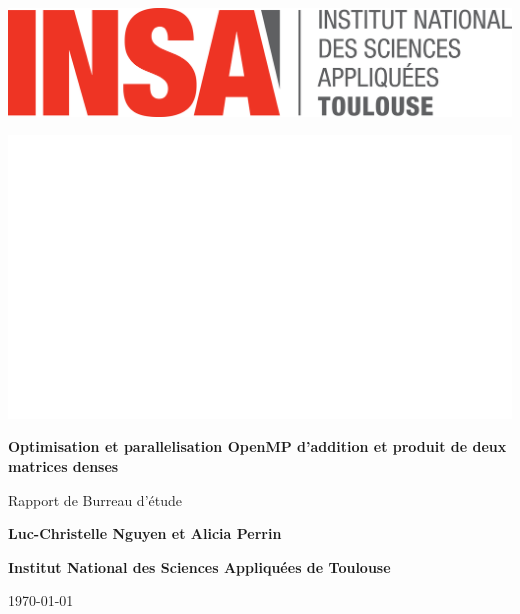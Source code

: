 \documentclass{report}
\begin{document}
\begin{titlepage}
    \centering

    \noindent %
    \begin{minipage}{0.5\textwidth}
        \includegraphics[width=0.5\linewidth]{images/logo_INSA.png} %
    \end{minipage}%
    \hfill %
    \begin{minipage}{0.5\textwidth}
        \flushright %
        \includegraphics[width=0.5\linewidth]{images/blanc.jpg} %
    \end{minipage}


    \vspace*{2cm} %
    {\Huge\bfseries Optimisation et parallelisation OpenMP d'addition et produit
de deux matrices denses \par}
    \vspace{1cm}
    {\huge Rapport de Burreau d'étude\par}
    \vspace{2cm}
    {\Large \textbf{Luc-Christelle Nguyen et Alicia Perrin} \par}
    \vspace{2cm}
    
    {\Large \textbf{Institut National des Sciences Appliquées de Toulouse} \par}
    \vspace{1cm}
    {\large \today \par}
\end{titlepage}

\begin{abstract}
  Dans ce rapport, nous allons tester plusieurs méthodes différentes afin d'optimiser des calculs matriciels (somme, produit scalaire, produit matricielle). A COMPLETER
\end{abstract}
\end{document}
